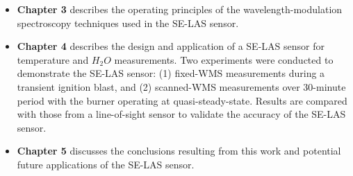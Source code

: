 \begin{itemize}
\item \textbf{Chapter 3} describes the operating principles of the wavelength-modulation spectroscopy techniques used in the SE-LAS sensor.
\end{itemize}

\begin{itemize}
\item \textbf{Chapter 4} describes the design and application of a SE-LAS sensor for temperature and $H_2O$ measurements. Two experiments were conducted to demonstrate the SE-LAS sensor: (1) fixed-WMS measurements during a transient ignition blast, and (2) scanned-WMS measurements over 30-minute period with the burner operating at quasi-steady-state. Results are compared with those from a line-of-sight sensor to validate the accuracy of the SE-LAS sensor.
\end{itemize}


\begin{itemize}
\item \textbf{Chapter 5} discusses the conclusions resulting from this work and potential future applications of the SE-LAS sensor.
\end{itemize}

